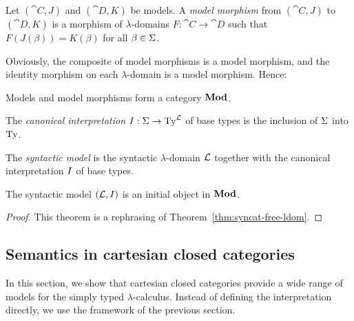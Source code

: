 \begin{defn}
Let $(\cat{C}, J)$ and $(\cat{D}, K)$ be models. A \emph{model morphism} from $(\cat{C}, J)$ to $(\cat{D}, K)$ is a morphism of $\lambda$-domains $F : \cat{C} \to \cat{D}$ such that $F(J(\beta)) = K(\beta)$ for all $\beta \in \Sigma$.
\end{defn}

Obviously, the composite of model morphisms is a model morphism, and the identity morphism on each $\lambda$-domain is a model morphism. Hence:

\begin{defn} \label{def:cat-mod}
Models and model morphisms form a category $\mathbf{Mod}$.
\end{defn}

\begin{defn} \label{def:syn-mod}
\begin{enum}
\item The \emph{canonical interpretation} $\canint : \Basetypes \to \STy[\syncat]$ of base types is the inclusion of $\Sigma$ into $\mathrm{Ty}$.
\item The \emph{syntactic model} is the syntactic $\lambda$-domain $\mathcal{L}$ together with the canonical interpretation $I$ of base types.
\end{enum}
\end{defn}

\begin{thm} \label{thm:syn-mod-init}
The syntactic model $(\mathcal{L}, I)$ is an initial object in $\mathbf{Mod}$.
\begin{proof}
This theorem is a rephrasing of Theorem~\ref{thm:syncat-free-ldom}.
\end{proof}
\end{thm}


\subsection{Semantics in cartesian closed categories}

In this section, we show that cartesian closed categories provide a wide range of models for the simply typed $\lambda$-calculus. Instead of defining the interpretation directly, we use the framework of the previous section.

